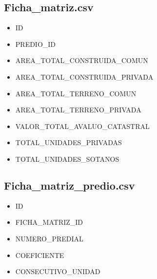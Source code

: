 \documentclass[letterpaper,10pt,spanish]{sphinxmanual}
\begin{document}
\subsection{Ficha\_matriz.csv}
\label{\detokenize{ETL_SNC/Structure:ficha-matriz-csv}}\begin{itemize}
\item {} 
ID

\item {} 
PREDIO\_ID

\item {} 
AREA\_TOTAL\_CONSTRUIDA\_COMUN

\item {} 
AREA\_TOTAL\_CONSTRUIDA\_PRIVADA

\item {} 
AREA\_TOTAL\_TERRENO\_COMUN

\item {} 
AREA\_TOTAL\_TERRENO\_PRIVADA

\item {} 
VALOR\_TOTAL\_AVALUO\_CATASTRAL

\item {} 
TOTAL\_UNIDADES\_PRIVADAS

\item {} 
TOTAL\_UNIDADES\_SOTANOS

\end{itemize}


\subsection{Ficha\_matriz\_predio.csv}
\label{\detokenize{ETL_SNC/Structure:ficha-matriz-predio-csv}}\begin{itemize}
\item {} 
ID

\item {} 
FICHA\_MATRIZ\_ID

\item {} 
NUMERO\_PREDIAL

\item {} 
COEFICIENTE

\item {} 
CONSECUTIVO\_UNIDAD

\end{itemize}
\end{document}
